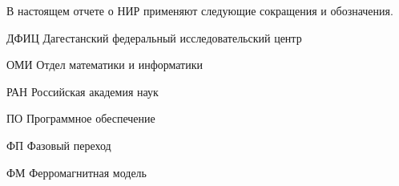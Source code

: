 \documentclass[utf8,usehyperref,12pt]{G7-32}
\begin{document}

\frontmatter %

\NirTitle{}

\Executors %




\setcounter{tocdepth}{2} %

\tableofcontents


\Abbreviations %
В настоящем отчете о НИР применяют следующие сокращения и обозначения.
\begin{abbreviation}
\item[ДФИЦ] Дагестанский федеральный исследовательский центр
\item[ОМИ] Отдел математики и информатики
\item[РАН] Российская академия наук
\item[ПО] Программное обеспечение
\item[ФП] Фазовый переход
\item[ФМ] Ферромагнитная модель
\end{abbreviation}



\mainmatter %



\backmatter %



\end{document}
